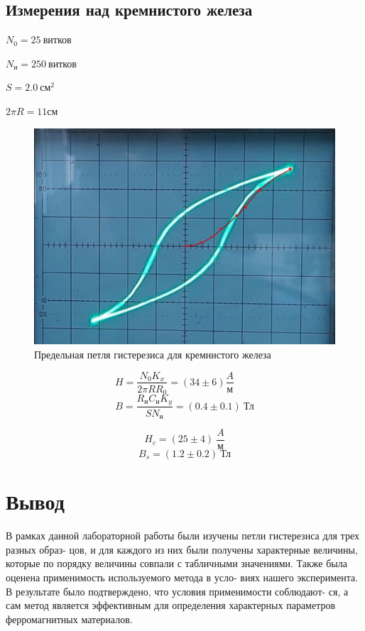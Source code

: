 \documentclass[a4paper]{article}
\begin{document}
\newpage

\subsection{Измерения над кремнистого железа}
$N_0 = 25 \ \text{витков}$

$N_\text{и} = 250 \ \text{витков}$

$S = 2.0 \ \text{см}^2$

$2 \pi R = 11 \text{см}$

\begin{figure}[h!]
    \centering
    \includegraphics[width=0.5\pdfpagewidth]{13.jpg}
    \caption{Предельная петля гистерезиса для кремнистого железа}
\end{figure}

\begin{equation*}
    H = \frac{N_0 K_x}{2\pi RR_0} = (34 \pm 6) \frac{A}{\text{м}} \qquad 
\end{equation*}
\begin{equation*}
    B = \frac{R_\text{и} C_\text{и} K_y}{S N_\text{и}} = (0.4 \pm 0.1) \ \text{Тл}
\end{equation*}

\begin{equation*}
    H_c = (25 \pm 4) \ \frac{A}{\text{м}}
\end{equation*}
\begin{equation*}
    B_s = (1.2 \pm 0.2) \ \text{Тл}
\end{equation*}

\section{Вывод}

В рамках данной лабораторной работы были изучены петли гистерезиса для трех разных образ-
цов, и для каждого из них были получены характерные величины, которые по порядку величины
совпали с табличными значениями. Также была оценена применимость используемого метода в усло-
виях нашего эксперимента. В результате было подтверждено, что условия применимости соблюдают-
ся, а сам метод является эффективным для определения характерных параметров ферромагнитных
материалов.
\end{document}
